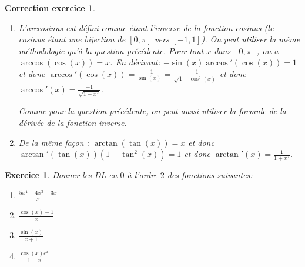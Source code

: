 \documentclass[12pt]{article}
\newtheorem{exercice}{\bf Exercice}
\newtheorem{correction}{\bf Correction exercice}
\newenvironment{exo}{
  \begin{exercice}\normalfont}{\end{exercice}
}
\newenvironment{cor}{
\begin{correction}\smallskip\normalfont}{\end{correction}
}
\begin{document}
\begin{cor}
\begin{enumerate}
  Notez que l'on peut aussi utiliser la formule de la d\'eriv\'ee de l'inverse d'une fonction:
  $(f^{-1})'(x) = \frac{1}{f'(f^{-1}(x))} = \frac{1}{\cos(\arcsin(x))}$ avec $f(x) = \sin(x)$.
  De plus, pour compl\'eter cette d\'emonstration, on peut montrer que $\cos(\arcsin(x)) = \sqrt{1 - x^2}$ :
  ceci vient de $\cos^2(t) + \sin^2(t) = 1$ combin\'e avec le changement de variables
  $t = \arcsin(x)$.

\item L'arccosinus est d\'efini comme \'etant l'inverse de la fonction cosinus
  (le cosinus \'etant une bijection de $[0,\pi]$ vers $[-1,1]$).
  On peut utiliser la m\^eme m\'ethodologie qu'\`a la question pr\'ec\'edente.
  Pour tout $x$ dans $[0,\pi]$, on a $\arccos(\cos(x)) = x$. En d\'erivant:
  $- \sin(x) \arccos'(\cos(x)) = 1$ et donc
  $\arccos'(\cos(x)) = \frac{-1}{\sin(x)} = \frac{-1}{\sqrt{1-\cos^2(x)}}$
  et donc $\arccos'(x) = \frac{-1}{\sqrt{1-x^2}}$.

  Comme pour la question pr\'ec\'edente, on peut aussi utiliser la formule de la d\'eriv\'ee
  de la fonction inverse.

\item De la m\^eme fa\c{c}on :
  $\arctan(\tan(x)) = x$
  et donc
  $\arctan'(\tan(x)) (1+\tan^2(x)) = 1$
  et donc $\arctan'(x) = \frac{1}{1+x^2}$.
\end{enumerate}
\end{cor}
\color{black}
\fi


\begin{exo} Donner les DL en $0$ à l'ordre $2$ des fonctions suivantes:
\begin{multicols}{4}
\begin{enumerate}
\item $\frac{5x^4 - 4 x^3 - 3x}{x}$
\item $\frac{\cos(x)-1}{x}$
\item $\frac{\sin(x)}{x+1}$
\item $\frac{\cos(x)e^x}{1-x}$
\end{enumerate}
\end{multicols}
\end{exo}
\end{document}
